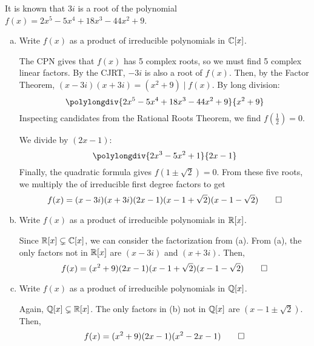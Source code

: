 \begin{prob}
  It is known that $3i$ is a root of the polynomial $f(x) = 2x^5 - 5x^4 + 18x^3 - 44x^2 + 9$.
  \begin{enumerate}[(a)]
    \item Write $f(x)$ as a product of irreducible polynomials in $\mathbb{C}[x]$.
          \begin{sol}
            The CPN gives that $f(x)$ has 5 complex roots, so we must find 5 complex linear factors.
            By the CJRT, $-3i$ is also a root of $f(x)$.
            Then, by the Factor Theorem, $(x-3i)(x+3i) = (x^2+9) \mid f(x)$.
            By long division: \[ \polylongdiv{2x^5 - 5x^4 + 18x^3 - 44x^2 + 9}{x^2 + 9} \]
            Inspecting candidates from the Rational Roots Theorem, we find $f(\frac12) = 0$.
            
            We divide by $(2x-1)$:
            \[ \polylongdiv{2x^3 - 5x^2 + 1}{2x-1} \]
            Finally, the quadratic formula gives $f(1\pm\sqrt{2}) = 0$.
            From these five roots, we multiply the of irreducible first degree factors to get
            \[ f(x) = (x-3i)(x+3i)(2x-1)(x-1+\sqrt{2})(x-1-\sqrt{2}) \qedhere \]
          \end{sol}
    \item Write $f(x)$ as a product of irreducible polynomials in $\mathbb{R}[x]$.
          \begin{sol}
            Since $\mathbb{R}[x] \subsetneq \mathbb{C}[x]$, we can consider the factorization from (a).
            From (a), the only factors not in $\mathbb{R}[x]$ are $(x-3i)$ and $(x+3i)$. Then,
            \[ f(x) = (x^2+9)(2x-1)(x-1+\sqrt{2})(x-1-\sqrt{2}) \qedhere \]
          \end{sol}
    \item Write $f(x)$ as a product of irreducible polynomials in $\mathbb{Q}[x]$.
          \begin{sol}
            Again, $\mathbb{Q}[x] \subsetneq \mathbb{R}[x]$.
            The only factors in (b) not in $\mathbb{Q}[x]$ are $(x-1\pm\sqrt{2})$. Then,
            \[ f(x) = (x^2+9)(2x-1)(x^2-2x-1) \qedhere \]
          \end{sol}
  \end{enumerate}
\end{prob}

